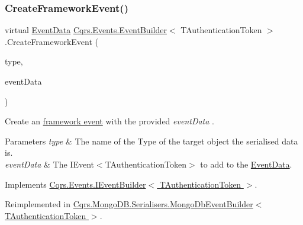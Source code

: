 \subsubsection{\texorpdfstring{Create\+Framework\+Event()}{CreateFrameworkEvent()}\hspace{0.1cm}{\footnotesize\ttfamily [1/2]}}
{\footnotesize\ttfamily virtual \hyperlink{classCqrs_1_1Events_1_1EventData}{Event\+Data} \hyperlink{classCqrs_1_1Events_1_1EventBuilder}{Cqrs.\+Events.\+Event\+Builder}$<$ T\+Authentication\+Token $>$.Create\+Framework\+Event (\begin{DoxyParamCaption}\item[{string}]{type,  }\item[{\hyperlink{interfaceCqrs_1_1Events_1_1IEvent}{I\+Event}$<$ T\+Authentication\+Token $>$}]{event\+Data }\end{DoxyParamCaption})\hspace{0.3cm}{\ttfamily [virtual]}}



Create an \hyperlink{}{framework event} with the provided {\itshape event\+Data} . 


\begin{DoxyParams}{Parameters}
{\em type} & The name of the Type of the target object the serialised data is.\\
\hline
{\em event\+Data} & The I\+Event$<$\+T\+Authentication\+Token$>$ to add to the \hyperlink{classCqrs_1_1Events_1_1EventData}{Event\+Data}.\\
\hline
\end{DoxyParams}


Implements \hyperlink{interfaceCqrs_1_1Events_1_1IEventBuilder_ac77123302de4e79df9661c13219af4d4_ac77123302de4e79df9661c13219af4d4}{Cqrs.\+Events.\+I\+Event\+Builder$<$ T\+Authentication\+Token $>$}.



Reimplemented in \hyperlink{classCqrs_1_1MongoDB_1_1Serialisers_1_1MongoDbEventBuilder_a06afbb994fd3f679f275dea3d1d60c6e_a06afbb994fd3f679f275dea3d1d60c6e}{Cqrs.\+Mongo\+D\+B.\+Serialisers.\+Mongo\+Db\+Event\+Builder$<$ T\+Authentication\+Token $>$}.

\mbox{\label{classCqrs_1_1Events_1_1EventBuilder_abcc2515f98e4852ab656f1868e7a344c_abcc2515f98e4852ab656f1868e7a344c}} 
